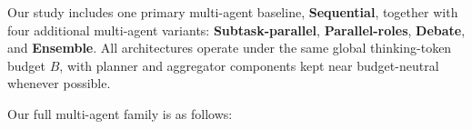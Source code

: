 \documentclass{article} %
\begin{document}
Our study includes one primary multi-agent baseline, \textbf{Sequential}, together with four additional multi-agent variants: \textbf{Subtask-parallel}, \textbf{Parallel-roles}, \textbf{Debate}, and \textbf{Ensemble}. All architectures operate under the same global thinking-token budget \(B\), with planner and aggregator components kept near budget-neutral whenever possible.

Our full multi-agent family is as follows:


\end{document}
